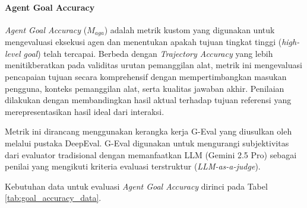 \paragraph{Agent Goal Accuracy}
\textit{Agent Goal Accuracy} ($M_{aga}$) adalah metrik kustom yang digunakan untuk mengevaluasi eksekusi agen dan menentukan apakah tujuan tingkat tinggi (\textit{high-level goal}) telah tercapai. Berbeda dengan \textit{Trajectory Accuracy} yang lebih menitikberatkan pada validitas urutan pemanggilan alat, metrik ini mengevaluasi pencapaian tujuan secara komprehensif dengan mempertimbangkan masukan pengguna, konteks pemanggilan alat, serta kualitas jawaban akhir. Penilaian dilakukan dengan membandingkan hasil aktual terhadap tujuan referensi yang merepresentasikan hasil ideal dari interaksi.

Metrik ini dirancang menggunakan kerangka kerja G-Eval yang diusulkan oleh \textcite{liuGEvalNLGEvaluation2023} melalui pustaka DeepEval. G-Eval digunakan untuk mengurangi subjektivitas dari evaluator tradisional dengan memanfaatkan LLM (Gemini 2.5 Pro) sebagai penilai yang mengikuti kriteria evaluasi terstruktur (\textit{LLM-as-a-judge}).

Kebutuhan data untuk evaluasi \textit{Agent Goal Accuracy} dirinci pada Tabel \ref{tab:goal_accuracy_data}.

\begin{table}[H]
    \centering
    \caption{Kebutuhan Data untuk Evaluasi Agent Goal Accuracy}
    \label{tab:goal_accuracy_data}
    \small
\end{table}

